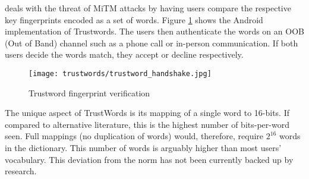 \pep deals with the threat of MiTM attacks by having users compare the respective key fingerprints encoded as a set of words. Figure \ref{fig:trustwords} shows the \pep Android implementation of Trustwords. The users then authenticate the words on an OOB (Out of Band) channel such as a phone call or in-person communication. If both users decide the words match, they accept or decline respectively.

\begin{figure}[h!]
    \centering
    \texttt{[image: trustwords/trustword\_handshake.jpg]}
    \caption{Trustword fingerprint verification}
    \label{fig:trustwords}
\end{figure}

The unique aspect of TrustWords is its mapping of a single word to 16-bits. If compared to alternative literature, this is the highest number of bits-per-word seen. Full mappings (no duplication of words) would, therefore, require $2^{16}$ words in the dictionary. This number of words is arguably higher than most users' vocabulary. This deviation from the norm has not been currently backed up by research. 
